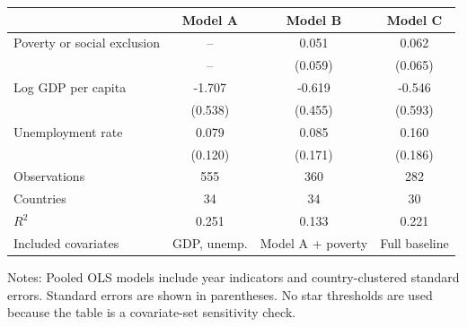 \begin{tabular}{@{}lccc@{}}
\toprule
 & Model A & Model B & Model C \\
\midrule
Poverty or social exclusion & -- & 0.051 & 0.062 \\
 & -- & (0.059) & (0.065) \\
Log GDP per capita & -1.707 & -0.619 & -0.546 \\
 & (0.538) & (0.455) & (0.593) \\
Unemployment rate & 0.079 & 0.085 & 0.160 \\
 & (0.120) & (0.171) & (0.186) \\
\midrule
Observations & 555 & 360 & 282 \\
Countries & 34 & 34 & 30 \\
\(R^2\) & 0.251 & 0.133 & 0.221 \\
Included covariates & GDP, unemp. & Model A + poverty & Full baseline \\
\bottomrule
\end{tabular}
\par\vspace{0.3em}
\begin{minipage}{0.96\textwidth}
\footnotesize Notes: Pooled OLS models include year indicators and country-clustered standard errors. Standard errors are shown in parentheses. No star thresholds are used because the table is a covariate-set sensitivity check.
\end{minipage}
